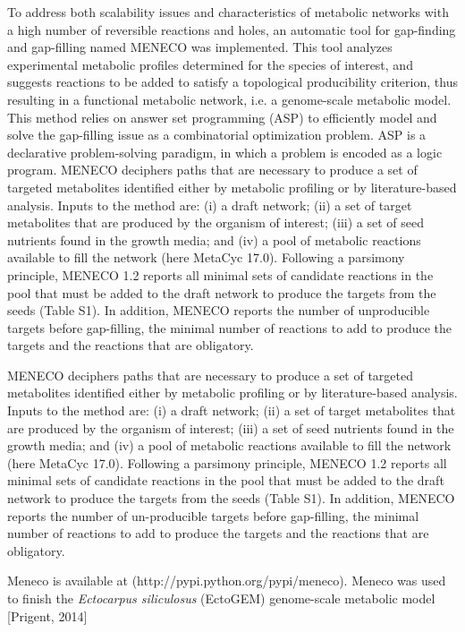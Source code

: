 \documentclass{article}
\begin{document}
To address both scalability issues and characteristics of metabolic networks with a high number of reversible reactions and holes, an automatic tool for gap-finding and gap-filling named MENECO was implemented. This tool analyzes experimental metabolic profiles determined for the species of interest, and suggests reactions to be added to satisfy a topological producibility criterion, thus resulting in a functional metabolic network, i.e. a genome-scale metabolic model.
This method relies on answer set programming (ASP) to efficiently model and solve the gap-filling issue as a combinatorial optimization problem. ASP is a declarative problem-solving paradigm, in which a problem is encoded as a logic program. MENECO deciphers paths that are necessary to produce a set of targeted metabolites identified either by metabolic profiling or by literature-based analysis. Inputs to the method are: (i) a draft network; (ii) a set of target metabolites that are produced by the organism of interest; (iii) a set of seed nutrients found in the growth media; and (iv) a pool of metabolic reactions available to fill the network (here MetaCyc 17.0). Following a parsimony principle, MENECO 1.2 reports all minimal sets of candidate reactions in the pool that must be added to the draft network to produce the targets from the seeds (Table S1). In addition, MENECO reports the number of unproducible targets before gap-filling, the minimal number of reactions to add to produce the targets and the reactions that are obligatory.

MENECO deciphers paths that are necessary to produce a set of targeted metabolites identified either by metabolic profiling or by literature-based analysis. Inputs to the method are: (i) a draft network; (ii) a set of target metabolites that are produced by the organism of interest; (iii) a set of seed nutrients found in the growth media; and (iv) a pool of metabolic reactions available to fill the network (here MetaCyc 17.0). Following a parsimony principle, MENECO 1.2 reports all minimal sets of candidate reactions in the pool that must be added to the draft network to produce the targets from the seeds (Table S1). In addition, MENECO reports the number of un-producible targets before gap-filling, the minimal number of reactions to add to produce the targets and the reactions that are obligatory.

Meneco is available at (http://pypi.python.org/pypi/meneco). Meneco was used to finish the \emph{Ectocarpus siliculosus} (EctoGEM) genome-scale metabolic model [Prigent, 2014]
\end{document}
